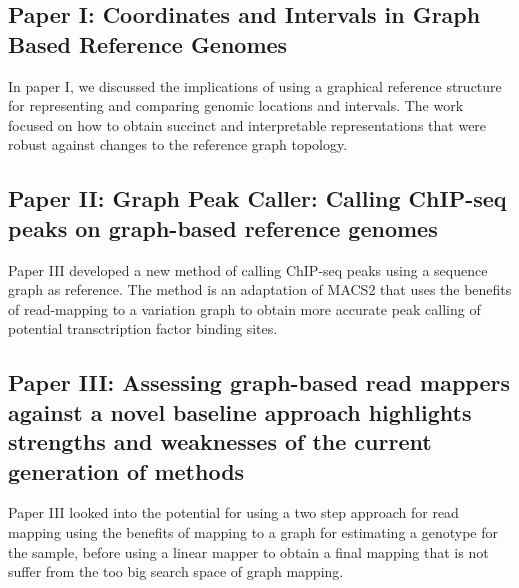 \subsection{Paper I: Coordinates and Intervals in Graph Based Reference Genomes}
In paper I, we discussed the implications of using a graphical reference structure for representing and comparing genomic locations and intervals.
The work focused on how to obtain succinct and interpretable representations that were robust against changes to the reference graph topology. 
\subsection{Paper II: Graph Peak Caller: Calling ChIP-seq peaks on graph-based reference genomes}
Paper III developed a new method of calling ChIP-seq peaks using a sequence graph as reference.
The method is an adaptation of MACS2 that uses the benefits of read-mapping to a variation graph to obtain more accurate peak calling of potential transctription factor binding sites. 
\subsection{Paper III: Assessing graph-based read mappers against a novel baseline approach highlights strengths and weaknesses of the current generation of methods}
  Paper III looked into the potential for using a two step approach for read mapping using the benefits of mapping to a graph for estimating a genotype for the sample, before using a linear mapper to obtain a final mapping that is not suffer from the too big search space of graph mapping. 

